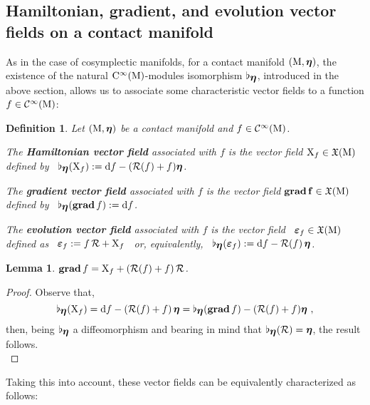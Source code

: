 \documentclass[12pt]{report}
\newtheorem{lem}[teor]{Lemma}
\newtheorem{definition}[teor]{Definition}
\def\qed{\ifvmode\removelastskip\fi
{\unskip\nobreak\hfil\penalty50\hbox{}\nobreak\hfil
\hbox{\vrule height1.2ex width1.2ex}\parfillskip=0pt
\finalhyphendemerits=0 \par\smallskip}}
\def\vf{\mathfrak X}
\def\d{{\rm d}}
\def\bmeta{\mbox{\boldmath $\eta$}}
\def\evo{\mbox{\boldmath $\varepsilon$}}
\def\X{{\rm X}}
\def\Cinfty{{\rm C}^\infty}
\newcommand{\Reeb}{\mathcal{R}}
\begin{document}
\subsection{Hamiltonian, gradient, and evolution vector fields on a contact manifold}


As in the case of cosymplectic manifolds,
for a contact manifold $({\rm M},\bmeta)$,
the existence of the natural $\Cinfty({\rm M})$-modules isomorphism $\flat_{\bmeta}$,
introduced in the above section,
allows us to associate some characteristic vector fields to a function $f\in\mathcal{C}^\infty({\rm M})$:

\begin{definition}
\label{GraHaEv}
Let $({\rm M},\bmeta)$ be a contact manifold and $f\in\mathcal{C}^\infty({\rm M})$.

 The {\sl \textbf{Hamiltonian vector field}} associated with $f$
is the vector field $\X_f\in\vf({\rm M})$ defined by
\ $\flat_{\bmeta}(\X_f):=\d f-(\Reeb(f)+f)\bmeta$.

The {\sl \textbf{gradient vector field}} associated with $f$
is the vector field ${\bf grad\, f}\in\vf({\rm M})$ defined by
\ $\flat_{\bmeta}({\bf grad}\, f):=\d f$.

The {\sl \textbf{evolution vector field}}  associated with $f$
is the vector field \ $\evo_f\in\vf({\rm M})$ defined as
 \ $\evo_f:=f\,\Reeb+\X_f$ \ or, equivalently,
 \ $\flat_{\bmeta}(\evo_f):=\d f-\Reeb(f)\,\bmeta$.
\end{definition}

\begin{lem} \label{prop:grad-evol}
\quad ${\bf grad}\,f=\X_f+(\Reeb(f)+f)\,\Reeb$.
\end{lem}
\begin{proof}
Observe that,
    $$
\flat_{\bmeta}(\X_f)=\d f-(\Reeb(f)+f)\,\bmeta=
\flat_{\bmeta}({\bf grad}\,f)-(\Reeb(f)+f)\bmeta \ ,
$$
then, being $\flat_{\bmeta}$ a diffeomorphism and bearing in mind that $\flat_{\bmeta}(\Reeb)=\bmeta$, the result follows.
\\ \qed \end{proof}

Taking this into account, these vector fields can be equivalently characterized as follows:
\end{document}
